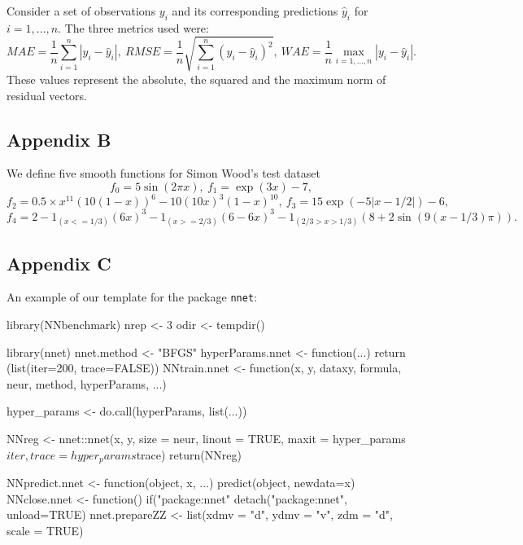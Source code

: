 Consider a set of observations \(y_i\) and its corresponding predictions
\(\hat y_i\) for \(i=1,\dots,n\). The three metrics used were: \[
MAE = \frac1n\sum_{i=1}^n|y_i - \hat y_i|,~
RMSE = \frac1n\sqrt{\sum_{i=1}^n(y_i - \hat y_i)^2},~
WAE = \frac1n\max_{i=1,\dots,n}|y_i - \hat y_i|.
\] These values represent the absolute, the squared and the maximum norm
of residual vectors.

\hypertarget{appendix-b}{%
\subsection{Appendix B}\label{appendix-b}}

We define five smooth functions for Simon Wood's test dataset \[
f_0=5\sin(2\pi x),~
f_1=\exp(3x)-7,
\] \[
f_2=0.5\times x^{11}(10(1 - x))^6 - 10 (10x)^3(1 - x)^{10},~
f_3=15 \exp(-5 |x-1/2|)-6,
\] \[
f_4=2-1_{(x <= 1/3)}(6x)^3 - 1_{(x >= 2/3)} (6-6x)^3 - 
1_{(2/3 > x > 1/3)}(8+2\sin(9(x-1/3)\pi)).
\]

\hypertarget{appendix-c}{%
\subsection{Appendix C}\label{appendix-c}}

An example of our template for the package \texttt{nnet}:

\begin{Schunk}
\begin{Sinput}
library(NNbenchmark)
nrep <- 3       
odir <- tempdir()

library(nnet)
nnet.method <- "BFGS"
hyperParams.nnet <- function(...) {
    return (list(iter=200, trace=FALSE))
}
NNtrain.nnet <- function(x, y, dataxy, formula, neur, method, hyperParams, ...) {
    
    hyper_params <- do.call(hyperParams, list(...))
    
    NNreg <- nnet::nnet(x, y, size = neur, linout = TRUE, 
                        maxit = hyper_params$iter, trace=hyper_params$trace)
    return(NNreg)
}
NNpredict.nnet  <- function(object, x, ...) { predict(object, newdata=x) }
NNclose.nnet    <- function() {  if("package:nnet" %
                                detach("package:nnet", unload=TRUE) }
nnet.prepareZZ  <- list(xdmv = "d", ydmv = "v", zdm = "d", scale = TRUE)
\end{Sinput}
\end{Schunk}

